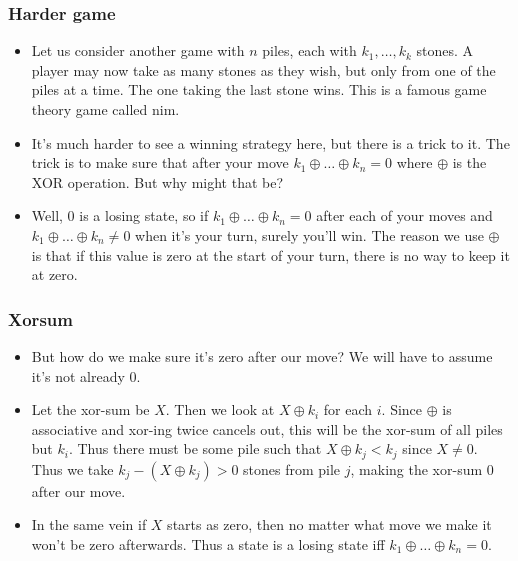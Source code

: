 \documentclass{beamer}
\begin{document}
\begin{frame}[plain]
    \frametitle{Harder game}

\begin{itemize}

\item Let us consider another game with $n$ piles, each with $k_1, \dots, k_k$ stones. A player may now take as many stones as they wish, but only from one of the piles at a time. The one taking the last stone wins. This is a famous game theory game called nim.

\item It's much harder to see a winning strategy here, but there is a trick to it. The trick is to make sure that after your move $k_1 \oplus \dots \oplus k_n = 0$ where $\oplus$ is the XOR operation. But why might that be?

\item Well, $0$ is a losing state, so if $k_1 \oplus \dots \oplus k_n = 0$ after each of your moves and $k_1 \oplus \dots \oplus k_n \neq 0$ when it's your turn, surely you'll win. The reason we use $\oplus$ is that if this value is zero at the start of your turn, there is no way to keep it at zero.

\end{itemize}

\end{frame}

\begin{frame}[plain]
\frametitle{Xorsum}

\begin{itemize}

\item But how do we make sure it's zero after our move? We will have to assume it's not already $0$.

\item Let the xor-sum be $X$. Then we look at $X \oplus k_i$ for each $i$. Since $\oplus$ is associative and xor-ing twice cancels out, this will be the xor-sum of all piles but $k_i$. Thus there must be some pile such that $X \oplus k_j < k_j$ since $X \neq 0$. Thus we take $k_j - (X \oplus k_j) > 0$ stones from pile $j$, making the xor-sum $0$ after our move.

\item In the same vein if $X$ starts as zero, then no matter what move we make it won't be zero afterwards. Thus a state is a losing state iff $k_1 \oplus \dots \oplus k_n = 0$.

\end{itemize}

\end{frame}
\end{document}
